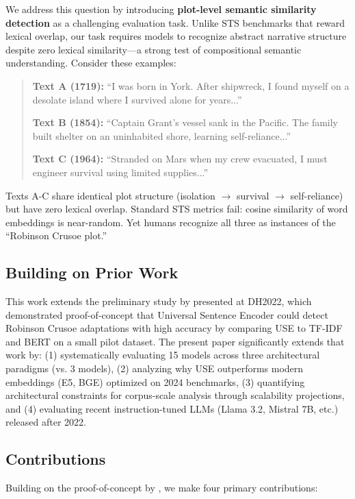 \documentclass[11pt]{article}
\begin{document}
We address this question by introducing \textbf{plot-level semantic similarity detection} as a challenging evaluation task. Unlike STS benchmarks that reward lexical overlap, our task requires models to recognize abstract narrative structure despite zero lexical similarity---a strong test of compositional semantic understanding. Consider these examples:

\begin{quote}
\small
\textbf{Text A (1719):} ``I was born in York. After shipwreck, I found myself on a desolate island where I survived alone for years...''

\textbf{Text B (1854):} ``Captain Grant's vessel sank in the Pacific. The family built shelter on an uninhabited shore, learning self-reliance...''

\textbf{Text C (1964):} ``Stranded on Mars when my crew evacuated, I must engineer survival using limited supplies...''
\end{quote}

Texts A-C share identical plot structure (isolation $\rightarrow$ survival $\rightarrow$ self-reliance) but have zero lexical overlap. Standard STS metrics fail: cosine similarity of word embeddings is near-random. Yet humans recognize all three as instances of the ``Robinson Crusoe plot.''

\subsection{Building on Prior Work}

This work extends the preliminary study by \citet{Glass2022DH} presented at DH2022, which demonstrated proof-of-concept that Universal Sentence Encoder could detect Robinson Crusoe adaptations with high accuracy by comparing USE to TF-IDF and BERT on a small pilot dataset. The present paper significantly extends that work by: (1) systematically evaluating 15 models across three architectural paradigms (vs. 3 models), (2) analyzing why USE outperforms modern embeddings (E5, BGE) optimized on 2024 benchmarks, (3) quantifying architectural constraints for corpus-scale analysis through scalability projections, and (4) evaluating recent instruction-tuned LLMs (Llama 3.2, Mistral 7B, etc.) released after 2022.

\subsection{Contributions}

Building on the proof-of-concept by \citet{Glass2022DH}, we make four primary contributions:
\end{document}
